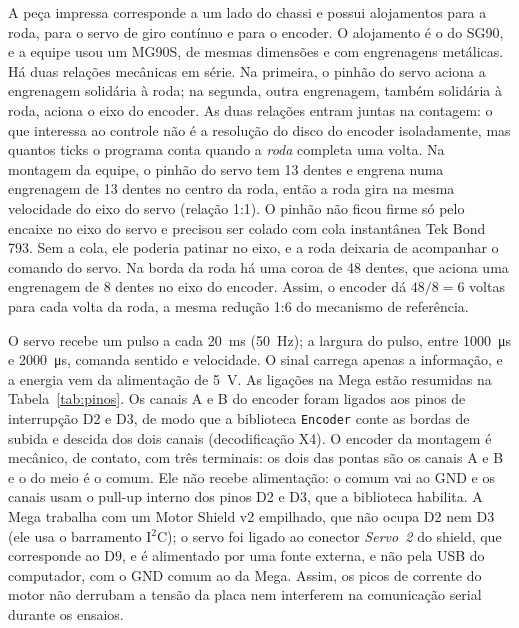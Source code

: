 \documentclass[12pt]{article}
\begin{document}
A peça impressa corresponde a um lado do chassi e possui alojamentos para a roda, para o servo de giro contínuo e para o encoder. O alojamento é o do SG90, e a equipe usou um MG90S, de mesmas dimensões e com engrenagens metálicas. Há duas relações mecânicas em série. Na primeira, o pinhão do servo aciona a engrenagem solidária à roda; na segunda, outra engrenagem, também solidária à roda, aciona o eixo do encoder. As duas relações entram juntas na contagem: o que interessa ao controle não é a resolução do disco do encoder isoladamente, mas quantos ticks o programa conta quando a \emph{roda} completa uma volta. Na montagem da equipe, o pinhão do servo tem 13 dentes e engrena numa engrenagem de 13 dentes no centro da roda, então a roda gira na mesma velocidade do eixo do servo (relação 1:1). O pinhão não ficou firme só pelo encaixe no eixo do servo e precisou ser colado com cola instantânea Tek Bond 793. Sem a cola, ele poderia patinar no eixo, e a roda deixaria de acompanhar o comando do servo. Na borda da roda há uma coroa de 48 dentes, que aciona uma engrenagem de 8 dentes no eixo do encoder. Assim, o encoder dá $48/8 = 6$ voltas para cada volta da roda, a mesma redução 1:6 do mecanismo de referência.

O servo recebe um pulso a cada \SI{20}{\milli\second} (\SI{50}{\hertz}); a largura do pulso, entre \SI{1000}{\micro\second} e \SI{2000}{\micro\second}, comanda sentido e velocidade. O sinal carrega apenas a informação, e a energia vem da alimentação de \SI{5}{\volt}. As ligações na Mega estão resumidas na Tabela~\ref{tab:pinos}. Os canais A e B do encoder foram ligados aos pinos de interrupção D2 e D3, de modo que a biblioteca \texttt{Encoder} conte as bordas de subida e descida dos dois canais (decodificação X4). O encoder da montagem é mecânico, de contato, com três terminais: os dois das pontas são os canais A e B e o do meio é o comum. Ele não recebe alimentação: o comum vai ao GND e os canais usam o pull-up interno dos pinos D2 e D3, que a biblioteca habilita. A Mega trabalha com um Motor Shield v2 empilhado, que não ocupa D2 nem D3 (ele usa o barramento I$^2$C); o servo foi ligado ao conector \emph{Servo~2} do shield, que corresponde ao D9, e é alimentado por uma fonte externa, e não pela USB do computador, com o GND comum ao da Mega. Assim, os picos de corrente do motor não derrubam a tensão da placa nem interferem na comunicação serial durante os ensaios.
\end{document}
